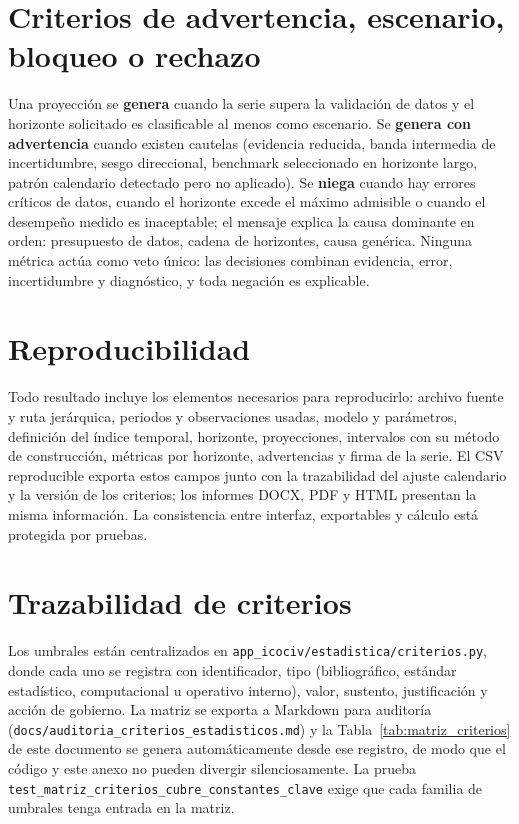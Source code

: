 \documentclass[12pt]{article}
\begin{document}
\section{Criterios de advertencia, escenario, bloqueo o rechazo}
\label{sec:decision}

Una proyecci\'on se \textbf{genera} cuando la serie supera la validaci\'on de datos y el horizonte solicitado es clasificable al menos como escenario. Se \textbf{genera con advertencia} cuando existen cautelas (evidencia reducida, banda intermedia de incertidumbre, sesgo direccional, benchmark seleccionado en horizonte largo, patr\'on calendario detectado pero no aplicado). Se \textbf{niega} cuando hay errores cr\'iticos de datos, cuando el horizonte excede el m\'aximo admisible o cuando el desempe\~no medido es inaceptable; el mensaje explica la causa dominante en orden: presupuesto de datos, cadena de horizontes, causa gen\'erica. Ninguna m\'etrica act\'ua como veto \'unico: las decisiones combinan evidencia, error, incertidumbre y diagn\'ostico, y toda negaci\'on es explicable.

\section{Reproducibilidad}
\label{sec:reproducibilidad}

Todo resultado incluye los elementos necesarios para reproducirlo: archivo fuente y ruta jer\'arquica, periodos y observaciones usadas, modelo y par\'ametros, definici\'on del \'indice temporal, horizonte, proyecciones, intervalos con su m\'etodo de construcci\'on, m\'etricas por horizonte, advertencias y firma de la serie. El CSV reproducible exporta estos campos junto con la trazabilidad del ajuste calendario y la versi\'on de los criterios; los informes DOCX, PDF y HTML presentan la misma informaci\'on. La consistencia entre interfaz, exportables y c\'alculo est\'a protegida por pruebas.

\section{Trazabilidad de criterios}
\label{sec:trazabilidad}

Los umbrales est\'an centralizados en \texttt{app\_icociv/estadistica/criterios.py}, donde cada uno se registra con identificador, tipo (bibliogr\'afico, est\'andar estad\'istico, computacional u operativo interno), valor, sustento, justificaci\'on y acci\'on de gobierno. La matriz se exporta a Markdown para auditor\'ia (\texttt{docs/auditoria\_criterios\_estadisticos.md}) y la Tabla~\ref{tab:matriz_criterios} de este documento se genera autom\'aticamente desde ese registro, de modo que el c\'odigo y este anexo no pueden divergir silenciosamente. La prueba \texttt{test\_matriz\_criterios\_cubre\_constantes\_clave} exige que cada familia de umbrales tenga entrada en la matriz.
\end{document}
